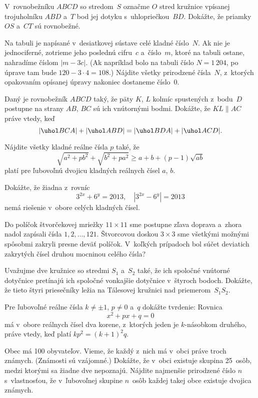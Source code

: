 {%
V~rovnobežníku $ABCD$ so stredom~$S$ označme
$O$ stred kružnice vpísanej trojuholníku $ABD$ a~$T$ bod jej
dotyku s~uhlopriečkou~$BD$. Dokážte, že priamky $OS$ a~$CT$ sú
rovnobežné.}

{%
Na tabuli je napísané v~desiatkovej sústave celé kladné číslo~$N$. Ak nie je jednociferné, zotrieme jeho poslednú cifru~$c$ a~číslo~$m$, ktoré na tabuli ostane, nahradíme číslom ${|m-3c|}$. (Ak napríklad bolo na tabuli číslo $N=1\,204$, po úprave tam bude $120-{3\cdot4}=108$.) Nájdite všetky prirodzené čísla~$N$, z~ktorých opakovaním opísanej úpravy nakoniec dostaneme číslo~$0$.}

{%
Daný je rovnobežník $ABCD$ taký, že päty $K$, $L$ kolmíc spustených z~bodu~$D$ postupne na strany $AB$, $BC$ sú ich vnútornými bodmi. Dokážte, že $KL\parallel AC$ práve vtedy, keď
$$
|\uhol BCA|+|\uhol ABD|=|\uhol BDA|+|\uhol ACD|.
$$}

{%
Nájdite všetky kladné reálne čísla $p$ také, že
$$
\sqrt{a^2+pb^2}+\sqrt{b^2+pa^2}\ge a+b+(p-1)\sqrt{ab}
$$
platí pre ľubovoľnú dvojicu kladných reálnych čísel $a$, $b$.}

{%
Dokážte, že žiadna z~rovníc
$$
3^{2x}+6^y=2013,\quad |3^{2x}-6^y|=2013
$$
nemá riešenie v~obore celých kladných čísel.
}

{%
Do políčok štvorčekovej mriežky $11{\times}11$ sme postupne zľava doprava a~zhora nadol
zapísali čísla $1,2,\dots,121$. Štvorcovou doskou $3{\times}3$ sme všetkými
možnými spôsobmi zakryli presne deväť políčok. V~koľkých prípadoch bol súčet deviatich zakrytých
čísel druhou mocninou celého čísla?
}

{%
Uvažujme dve kružnice so stredmi $S_1$ a~$S_2$ také, že ich
spoločné vnútorné dotyčnice pretínajú ich spoločné vonkajšie dotyčnice v~štyroch bodoch. Dokážte, že tieto
štyri priesečníky ležia na Tálesovej kružnici nad priemerom~$S_1S_2$.
}

{%
Pre ľubovoľné reálne čísla $k\ne\pm1$, $p\ne0$ a~$q$ dokážte tvrdenie: Rovnica
$$
x^2+px+q=0
$$
má v~obore reálnych čísel dva korene, z~ktorých jeden je $k$-násobkom druhého,
práve vtedy, keď platí $kp^2=(k+1)^2q$.}

{%
Obec má 100 obyvateľov. Vieme, že každý z~nich má v~obci práve troch známych. (Známosti sú
vzájomné.)
 Dokážte, že v~obci existuje skupina 25~osôb, medzi ktorými sa žiadne dve
nepoznajú.
 Nájdite najmenšie prirodzené číslo $n$ s~vlastnosťou, že v~ľubovoľnej
skupine $n$~osôb každej takej obce existuje dvojica známych.\endgraf}

